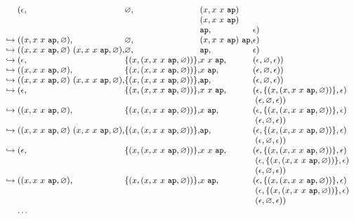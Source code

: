 \begin{displaymath}\small
  \begin{array}{l@{}l@{}l@{}l@{}l}
&(\epsilon, &\varnothing, &(x, x~x~\mathtt{ap})\\ &&& (x, x~x~\mathtt{ap}) \\ &&&\mathtt{ap}, &\epsilon)\\
\hookrightarrow{}&((x, x~x~\mathtt{ap}, \varnothing), &\varnothing, &(x, x~x~\mathtt{ap})~\mathtt{ap}, &\epsilon)\\
\hookrightarrow{}&((x, x~x~\mathtt{ap}, \varnothing)~(x, x~x~\mathtt{ap}, \varnothing), &\varnothing, &\mathtt{ap}, &\epsilon)\\
\hookrightarrow{}&(\epsilon, &\{(x, (x, x~x~\mathtt{ap}, \varnothing))\}, &x~x~\mathtt{ap}, &(\epsilon, \varnothing, \epsilon))\\
\hookrightarrow{}&((x, x~x~\mathtt{ap}, \varnothing), &\{(x, (x, x~x~\mathtt{ap}, \varnothing))\}, &x~\mathtt{ap}, &(\epsilon, \varnothing, \epsilon))\\
\hookrightarrow{}&((x, x~x~\mathtt{ap}, \varnothing)~(x, x~x~\mathtt{ap}, \varnothing), &\{(x, (x, x~x~\mathtt{ap}, \varnothing))\}, &\mathtt{ap}, &(\epsilon, \varnothing, \epsilon))\\
\hookrightarrow{}&(\epsilon, &\{(x, (x, x~x~\mathtt{ap}, \varnothing))\}, &x~x~\mathtt{ap}, &(\epsilon, \{(x, (x, x~x~\mathtt{ap}, \varnothing))\}, \epsilon)\\ &&&&\; (\epsilon, \varnothing, \epsilon))\\
\hookrightarrow{}&((x, x~x~\mathtt{ap}, \varnothing), &\{(x, (x, x~x~\mathtt{ap}, \varnothing))\}, &x~\mathtt{ap}, &(\epsilon, \{(x, (x, x~x~\mathtt{ap}, \varnothing))\}, \epsilon)\\ &&&&\;(\epsilon, \varnothing, \epsilon))\\
\hookrightarrow{}&((x, x~x~\mathtt{ap}, \varnothing)~(x, x~x~\mathtt{ap}, \varnothing), &\{(x, (x, x~x~\mathtt{ap}, \varnothing))\}, &\mathtt{ap}, &(\epsilon, \{(x, (x, x~x~\mathtt{ap}, \varnothing))\}, \epsilon)\\ &&&&\;(\epsilon, \varnothing, \epsilon))\\
\hookrightarrow{}&(\epsilon, &\{(x, (x, x~x~\mathtt{ap}, \varnothing))\}, &x~x~\mathtt{ap}, &(\epsilon, \{(x, (x, x~x~\mathtt{ap}, \varnothing))\}, \epsilon)\\ &&&&\; (\epsilon, \{(x, (x, x~x~\mathtt{ap}, \varnothing))\}, \epsilon)\\ &&&&\; (\epsilon, \varnothing, \epsilon))\\
\hookrightarrow{}&((x, x~x~\mathtt{ap}, \varnothing), &\{(x, (x, x~x~\mathtt{ap}, \varnothing))\}, &x~\mathtt{ap}, &(\epsilon, \{(x, (x, x~x~\mathtt{ap}, \varnothing))\}, \epsilon)\\ &&&&\;(\epsilon, \{(x, (x, x~x~\mathtt{ap}, \varnothing))\}, \epsilon)\\ &&&&\;(\epsilon, \varnothing, \epsilon))
\\
& \ldots
  \end{array}
\end{displaymath}
